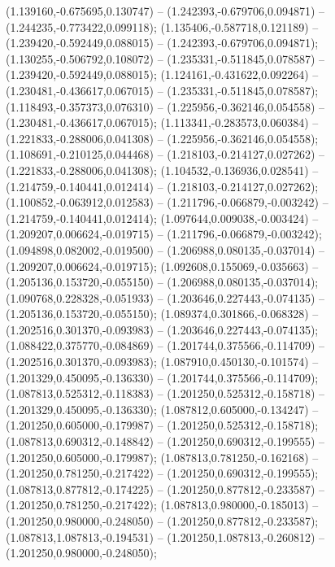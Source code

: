  (1.139160,-0.675695,0.130747) -- (1.242393,-0.679706,0.094871) -- (1.244235,-0.773422,0.099118);
 (1.135406,-0.587718,0.121189) -- (1.239420,-0.592449,0.088015) -- (1.242393,-0.679706,0.094871);
 (1.130255,-0.506792,0.108072) -- (1.235331,-0.511845,0.078587) -- (1.239420,-0.592449,0.088015);
 (1.124161,-0.431622,0.092264) -- (1.230481,-0.436617,0.067015) -- (1.235331,-0.511845,0.078587);
 (1.118493,-0.357373,0.076310) -- (1.225956,-0.362146,0.054558) -- (1.230481,-0.436617,0.067015);
 (1.113341,-0.283573,0.060384) -- (1.221833,-0.288006,0.041308) -- (1.225956,-0.362146,0.054558);
 (1.108691,-0.210125,0.044468) -- (1.218103,-0.214127,0.027262) -- (1.221833,-0.288006,0.041308);
 (1.104532,-0.136936,0.028541) -- (1.214759,-0.140441,0.012414) -- (1.218103,-0.214127,0.027262);
 (1.100852,-0.063912,0.012583) -- (1.211796,-0.066879,-0.003242) -- (1.214759,-0.140441,0.012414);
 (1.097644,0.009038,-0.003424) -- (1.209207,0.006624,-0.019715) -- (1.211796,-0.066879,-0.003242);
 (1.094898,0.082002,-0.019500) -- (1.206988,0.080135,-0.037014) -- (1.209207,0.006624,-0.019715);
 (1.092608,0.155069,-0.035663) -- (1.205136,0.153720,-0.055150) -- (1.206988,0.080135,-0.037014);
 (1.090768,0.228328,-0.051933) -- (1.203646,0.227443,-0.074135) -- (1.205136,0.153720,-0.055150);
 (1.089374,0.301866,-0.068328) -- (1.202516,0.301370,-0.093983) -- (1.203646,0.227443,-0.074135);
 (1.088422,0.375770,-0.084869) -- (1.201744,0.375566,-0.114709) -- (1.202516,0.301370,-0.093983);
 (1.087910,0.450130,-0.101574) -- (1.201329,0.450095,-0.136330) -- (1.201744,0.375566,-0.114709);
 (1.087813,0.525312,-0.118383) -- (1.201250,0.525312,-0.158718) -- (1.201329,0.450095,-0.136330);
 (1.087812,0.605000,-0.134247) -- (1.201250,0.605000,-0.179987) -- (1.201250,0.525312,-0.158718);
 (1.087813,0.690312,-0.148842) -- (1.201250,0.690312,-0.199555) -- (1.201250,0.605000,-0.179987);
 (1.087813,0.781250,-0.162168) -- (1.201250,0.781250,-0.217422) -- (1.201250,0.690312,-0.199555);
 (1.087813,0.877812,-0.174225) -- (1.201250,0.877812,-0.233587) -- (1.201250,0.781250,-0.217422);
 (1.087813,0.980000,-0.185013) -- (1.201250,0.980000,-0.248050) -- (1.201250,0.877812,-0.233587);
 (1.087813,1.087813,-0.194531) -- (1.201250,1.087813,-0.260812) -- (1.201250,0.980000,-0.248050);
